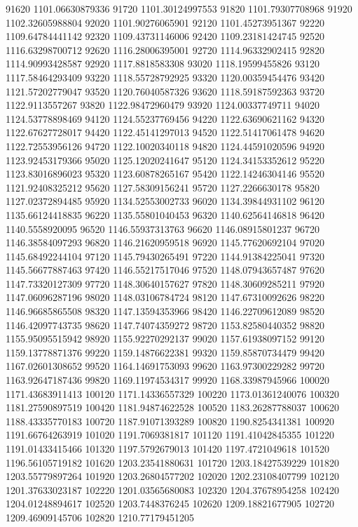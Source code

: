 {91620 1101.06630879336
91720 1101.30124997553
91820 1101.79307708968
91920 1102.32605988804
92020 1101.90276065901
92120 1101.45273951367
92220 1109.64784441142
92320 1109.43731146006
92420 1109.23181424745
92520 1116.63298700712
92620 1116.28006395001
92720 1114.96332902415
92820 1114.90993428587
92920 1117.8818583308
93020 1118.19599455826
93120 1117.58464293409
93220 1118.55728792925
93320 1120.00359454476
93420 1121.57202779047
93520 1120.76040587326
93620 1118.59187592363
93720 1122.9113557267
93820 1122.98472960479
93920 1124.00337749711
94020 1124.53778898469
94120 1124.55237769456
94220 1122.63690621162
94320 1122.67627728017
94420 1122.45141297013
94520 1122.51417061478
94620 1122.72553956126
94720 1122.10020340118
94820 1124.44591020596
94920 1123.92453179366
95020 1125.12020241647
95120 1124.34153352612
95220 1123.83016896023
95320 1123.60878265167
95420 1122.14246304146
95520 1121.92408325212
95620 1127.58309156241
95720 1127.2266630178
95820 1127.02372894485
95920 1134.52553002733
96020 1134.39844931102
96120 1135.66124418835
96220 1135.55801040453
96320 1140.62564146818
96420 1140.5558920095
96520 1146.55937313763
96620 1146.08915801237
96720 1146.38584097293
96820 1146.21620959518
96920 1145.77620692104
97020 1145.68492244104
97120 1145.79430265491
97220 1144.91384225041
97320 1145.56677887463
97420 1146.55217517046
97520 1148.07943657487
97620 1147.73320127309
97720 1148.30640157627
97820 1148.30609285211
97920 1147.06096287196
98020 1148.03106784724
98120 1147.67310092626
98220 1146.96685865508
98320 1147.13594353966
98420 1146.22709612089
98520 1146.42097743735
98620 1147.74074359272
98720 1153.82580440352
98820 1155.95095515942
98920 1155.92270292137
99020 1157.61938097152
99120 1159.13778871376
99220 1159.14876622381
99320 1159.85870734479
99420 1167.02601308652
99520 1164.14691753093
99620 1163.97300229282
99720 1163.92647187436
99820 1169.11974534317
99920 1168.33987945966
100020 1171.43683911413
100120 1171.14336557329
100220 1173.01361240076
100320 1181.27590897519
100420 1181.94874622528
100520 1183.26287788037
100620 1188.43335770183
100720 1187.91071393289
100820 1190.8254341381
100920 1191.66764263919
101020 1191.7069381817
101120 1191.41042845355
101220 1191.01433415466
101320 1197.5792679013
101420 1197.4721049618
101520 1196.56105719182
101620 1203.23541880631
101720 1203.18427539229
101820 1203.55779897264
101920 1203.26804577202
102020 1202.23108407799
102120 1201.37633023187
102220 1201.03565680083
102320 1204.37678954258
102420 1204.01248894617
102520 1203.7448376245
102620 1209.18821677905
102720 1209.46909145706
102820 1210.77179451205
}
